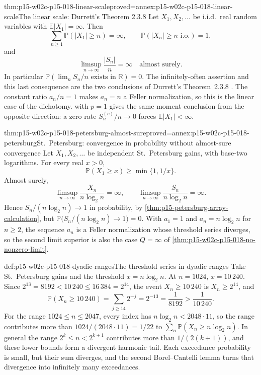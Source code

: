\begin{hbcorollary}{thm:p15-w02c-p15-018-linear-scale}{proved=annex:p15-w02c-p15-018-linear-scale}{The linear scale: Durrett's Theorem 2.3.8}
Let \(X_1,X_2,\ldots\) be i.i.d.\ real random variables with
\(\mathbb E|X_1|=\infty\). Then
\[
 \sum_{n\geq1}\mathbb P(|X_1|\geq n)=\infty,\qquad
 \mathbb P(|X_n|\geq n\text{ i.o.})=1,
\]
and
\[
 \limsup_{n\to\infty}\frac{|S_n|}{n}=\infty\quad\text{almost surely}.
\]
In particular \(\mathbb P(\lim_nS_n/n\text{ exists in }\mathbb R)=0\).
The infinitely-often assertion and this last consequence are the two
conclusions of Durrett's Theorem~2.3.8
\cite[p.~70]{DurrettPTEAuthor2019}. The constant ratio
\(a_n/n=1\) makes \(a_n=n\) a Feller normalization, so this is the
linear case of the dichotomy.  with
\(p=1\) gives the same moment conclusion from the opposite direction:
a zero rate \(S_n^{(c)}/n\to0\) forces \(\mathbb E|X_1|<\infty\).
\end{hbcorollary}

\begin{hbtheorem}{thm:p15-w02c-p15-018-petersburg-almost-sure}{proved=annex:p15-w02c-p15-018-petersburg}{St.~Petersburg: convergence in probability without almost-sure convergence}
Let \(X_1,X_2,\ldots\) be independent St.~Petersburg gains, with
base-two logarithms. For every real \(x>0\),
\[
 \mathbb P(X_1\geq x)\geq\min\{1,1/x\}.
\]
Almost surely,
\[
 \limsup_{n\to\infty}\frac{X_n}{n\log_2n}=\infty,\qquad
 \limsup_{n\to\infty}\frac{S_n}{n\log_2n}=\infty.
\]
Hence \(S_n/(n\log_2n)\to1\) in probability, by
\cref{thm:p15-petersburg-array-calculation}, but
\(\mathbb P\bigl(S_n/(n\log_2n)\to1\bigr)=0\).
With \(a_1=1\) and \(a_n=n\log_2n\) for \(n\geq2\), the sequence
\(a_n\) is a Feller normalization whose threshold series diverges, so
the second limit superior is also the case \(Q=\infty\) of
\cref{thm:p15-w02c-p15-018-no-nonzero-limit}.
\end{hbtheorem}

\begin{hbexample}{def:p15-w02c-p15-018-dyadic-ranges}{The threshold series in dyadic ranges}
Take St.~Petersburg gains and the threshold \(x=n\log_2n\).
At \(n=1024\), \(x=10\,240\). Since
\(2^{13}=8192<10\,240\leq16\,384=2^{14}\), the event
\(X_n\geq10\,240\) is \(X_n\geq2^{14}\), and
\[
 \mathbb P(X_n\geq10\,240)=\sum_{j\geq14}2^{-j}=2^{-13}
   =\frac1{8192}>\frac1{10\,240}.
\]
For the range \(1024\leq n\leq2047\), every index has
\(n\log_2n<2048\cdot11\), so the range contributes more than
\(1024/(2048\cdot11)=1/22\) to
\(\sum_n\mathbb P(X_n\geq n\log_2n)\). In general the range
\(2^k\leq n<2^{k+1}\) contributes more than \(1/(2(k+1))\), and these
lower bounds form a divergent harmonic tail. Each exceedance probability
is small, but their sum diverges, and the second Borel--Cantelli lemma
turns that divergence into infinitely many exceedances.
\end{hbexample}

